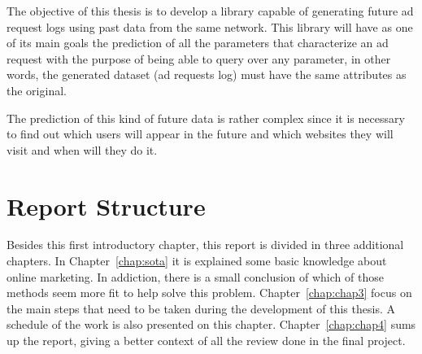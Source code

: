 The objective of this thesis is to develop a library capable of generating
future ad request logs using past data from the same network.
This library will have as one of its main goals the prediction of all the parameters that characterize an
ad request with the purpose of being able to query over any parameter, in other
words, the generated dataset (ad requests log) must have the same attributes as the original.

The prediction of this kind of future data is rather complex since it is
necessary to find out which users will appear in the future and which websites they
will visit and when will they do it.

\section{Report Structure} \label{sec:struct}

Besides this first introductory chapter, this report is divided in three additional chapters.
In Chapter~\ref{chap:sota} it is explained some basic knowledge about online marketing. In addiction, there is
a small conclusion of which of those methods seem more fit to help solve this problem.
Chapter~\ref{chap:chap3} focus on the main steps that need to be taken during the development of this thesis. A schedule of the work is also
presented on this chapter.
Chapter~\ref{chap:chap4} sums up the report, giving a better context of all the review done in the final project.
